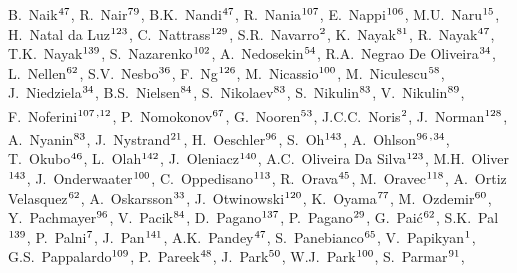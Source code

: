 \begin{flushleft}
B.~Naik$^\textrm{\scriptsize 47}$,
R.~Nair$^\textrm{\scriptsize 79}$,
B.K.~Nandi$^\textrm{\scriptsize 47}$,
R.~Nania$^\textrm{\scriptsize 107}$,
E.~Nappi$^\textrm{\scriptsize 106}$,
M.U.~Naru$^\textrm{\scriptsize 15}$,
H.~Natal da Luz$^\textrm{\scriptsize 123}$,
C.~Nattrass$^\textrm{\scriptsize 129}$,
S.R.~Navarro$^\textrm{\scriptsize 2}$,
K.~Nayak$^\textrm{\scriptsize 81}$,
R.~Nayak$^\textrm{\scriptsize 47}$,
T.K.~Nayak$^\textrm{\scriptsize 139}$,
S.~Nazarenko$^\textrm{\scriptsize 102}$,
A.~Nedosekin$^\textrm{\scriptsize 54}$,
R.A.~Negrao De Oliveira$^\textrm{\scriptsize 34}$,
L.~Nellen$^\textrm{\scriptsize 62}$,
S.V.~Nesbo$^\textrm{\scriptsize 36}$,
F.~Ng$^\textrm{\scriptsize 126}$,
M.~Nicassio$^\textrm{\scriptsize 100}$,
M.~Niculescu$^\textrm{\scriptsize 58}$,
J.~Niedziela$^\textrm{\scriptsize 34}$,
B.S.~Nielsen$^\textrm{\scriptsize 84}$,
S.~Nikolaev$^\textrm{\scriptsize 83}$,
S.~Nikulin$^\textrm{\scriptsize 83}$,
V.~Nikulin$^\textrm{\scriptsize 89}$,
F.~Noferini$^\textrm{\scriptsize 107}$\textsuperscript{,}$^\textrm{\scriptsize 12}$,
P.~Nomokonov$^\textrm{\scriptsize 67}$,
G.~Nooren$^\textrm{\scriptsize 53}$,
J.C.C.~Noris$^\textrm{\scriptsize 2}$,
J.~Norman$^\textrm{\scriptsize 128}$,
A.~Nyanin$^\textrm{\scriptsize 83}$,
J.~Nystrand$^\textrm{\scriptsize 21}$,
H.~Oeschler$^\textrm{\scriptsize 96}$,
S.~Oh$^\textrm{\scriptsize 143}$,
A.~Ohlson$^\textrm{\scriptsize 96}$\textsuperscript{,}$^\textrm{\scriptsize 34}$,
T.~Okubo$^\textrm{\scriptsize 46}$,
L.~Olah$^\textrm{\scriptsize 142}$,
J.~Oleniacz$^\textrm{\scriptsize 140}$,
A.C.~Oliveira Da Silva$^\textrm{\scriptsize 123}$,
M.H.~Oliver$^\textrm{\scriptsize 143}$,
J.~Onderwaater$^\textrm{\scriptsize 100}$,
C.~Oppedisano$^\textrm{\scriptsize 113}$,
R.~Orava$^\textrm{\scriptsize 45}$,
M.~Oravec$^\textrm{\scriptsize 118}$,
A.~Ortiz Velasquez$^\textrm{\scriptsize 62}$,
A.~Oskarsson$^\textrm{\scriptsize 33}$,
J.~Otwinowski$^\textrm{\scriptsize 120}$,
K.~Oyama$^\textrm{\scriptsize 77}$,
M.~Ozdemir$^\textrm{\scriptsize 60}$,
Y.~Pachmayer$^\textrm{\scriptsize 96}$,
V.~Pacik$^\textrm{\scriptsize 84}$,
D.~Pagano$^\textrm{\scriptsize 137}$,
P.~Pagano$^\textrm{\scriptsize 29}$,
G.~Pai\'{c}$^\textrm{\scriptsize 62}$,
S.K.~Pal$^\textrm{\scriptsize 139}$,
P.~Palni$^\textrm{\scriptsize 7}$,
J.~Pan$^\textrm{\scriptsize 141}$,
A.K.~Pandey$^\textrm{\scriptsize 47}$,
S.~Panebianco$^\textrm{\scriptsize 65}$,
V.~Papikyan$^\textrm{\scriptsize 1}$,
G.S.~Pappalardo$^\textrm{\scriptsize 109}$,
P.~Pareek$^\textrm{\scriptsize 48}$,
J.~Park$^\textrm{\scriptsize 50}$,
W.J.~Park$^\textrm{\scriptsize 100}$,
S.~Parmar$^\textrm{\scriptsize 91}$,

\end{flushleft}
